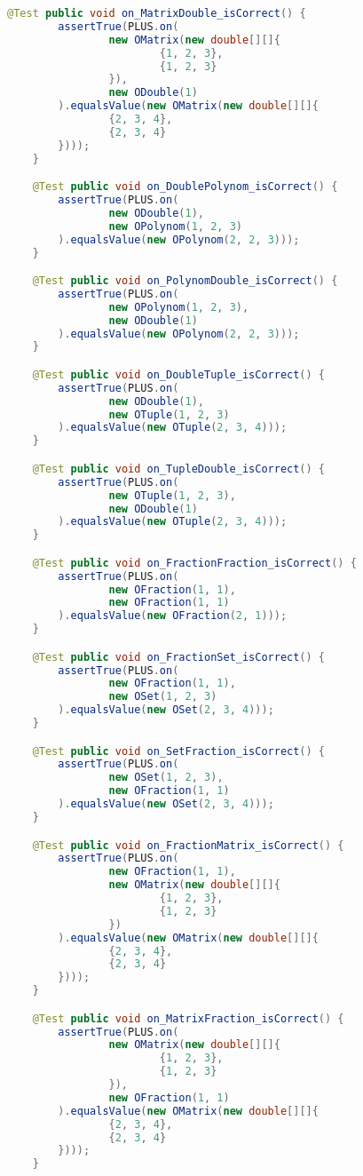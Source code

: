 \begin{lstlisting}[caption=PlusTest (Schwenke),label=list:PlusTest,language=Java]
    @Test public void on_MatrixDouble_isCorrect() {
        assertTrue(PLUS.on(
                new OMatrix(new double[][]{
                        {1, 2, 3},
                        {1, 2, 3}
                }),
                new ODouble(1)
        ).equalsValue(new OMatrix(new double[][]{
                {2, 3, 4},
                {2, 3, 4}
        })));
    }

    @Test public void on_DoublePolynom_isCorrect() {
        assertTrue(PLUS.on(
                new ODouble(1),
                new OPolynom(1, 2, 3)
        ).equalsValue(new OPolynom(2, 2, 3)));
    }

    @Test public void on_PolynomDouble_isCorrect() {
        assertTrue(PLUS.on(
                new OPolynom(1, 2, 3),
                new ODouble(1)
        ).equalsValue(new OPolynom(2, 2, 3)));
    }

    @Test public void on_DoubleTuple_isCorrect() {
        assertTrue(PLUS.on(
                new ODouble(1),
                new OTuple(1, 2, 3)
        ).equalsValue(new OTuple(2, 3, 4)));
    }

    @Test public void on_TupleDouble_isCorrect() {
        assertTrue(PLUS.on(
                new OTuple(1, 2, 3),
                new ODouble(1)
        ).equalsValue(new OTuple(2, 3, 4)));
    }

    @Test public void on_FractionFraction_isCorrect() {
        assertTrue(PLUS.on(
                new OFraction(1, 1),
                new OFraction(1, 1)
        ).equalsValue(new OFraction(2, 1)));
    }

    @Test public void on_FractionSet_isCorrect() {
        assertTrue(PLUS.on(
                new OFraction(1, 1),
                new OSet(1, 2, 3)
        ).equalsValue(new OSet(2, 3, 4)));
    }

    @Test public void on_SetFraction_isCorrect() {
        assertTrue(PLUS.on(
                new OSet(1, 2, 3),
                new OFraction(1, 1)
        ).equalsValue(new OSet(2, 3, 4)));
    }

    @Test public void on_FractionMatrix_isCorrect() {
        assertTrue(PLUS.on(
                new OFraction(1, 1),
                new OMatrix(new double[][]{
                        {1, 2, 3},
                        {1, 2, 3}
                })
        ).equalsValue(new OMatrix(new double[][]{
                {2, 3, 4},
                {2, 3, 4}
        })));
    }

    @Test public void on_MatrixFraction_isCorrect() {
        assertTrue(PLUS.on(
                new OMatrix(new double[][]{
                        {1, 2, 3},
                        {1, 2, 3}
                }),
                new OFraction(1, 1)
        ).equalsValue(new OMatrix(new double[][]{
                {2, 3, 4},
                {2, 3, 4}
        })));
    }


\end{lstlisting}

